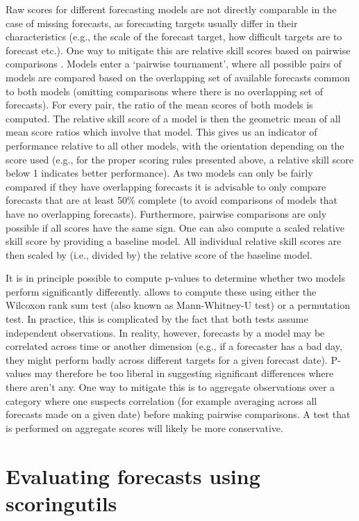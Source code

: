 \documentclass[
]{jss}
\begin{document}
Raw scores for different forecasting models are not directly comparable
in the case of missing forecasts, as forecasting targets usually differ
in their characteristics (e.g., the scale of the forecast target, how
difficult targets are to forecast etc.). One way to mitigate this are
relative skill scores based on pairwise comparisons
\citep{cramerEvaluationIndividualEnsemble2021}. Models enter a `pairwise
tournament', where all possible pairs of models are compared based on
the overlapping set of available forecasts common to both models
(omitting comparisons where there is no overlapping set of forecasts).
For every pair, the ratio of the mean scores of both models is computed.
The relative skill score of a model is then the geometric mean of all
mean score ratios which involve that model. This gives us an indicator
of performance relative to all other models, with the orientation
depending on the score used (e.g., for the proper scoring rules
presented above, a relative skill score below 1 indicates better
performance). As two models can only be fairly compared if they have
overlapping forecasts it is advisable to only compare forecasts that are
at least 50\% complete (to avoid comparisons of models that have no
overlapping forecasts). Furthermore, pairwise comparisons are only
possible if all scores have the same sign. One can also compute a scaled
relative skill score by providing a baseline model. All individual
relative skill scores are then scaled by (i.e., divided by) the relative
score of the baseline model.

It is in principle possible to compute p-values to determine whether two
models perform significantly differently.  allows to
compute these using either the Wilcoxon rank sum test (also known as
Mann-Whitney-U test) \citep{mannTestWhetherOne1947} or a permutation
test. In practice, this is complicated by the fact that both tests
assume independent observations. In reality, however, forecasts by a
model may be correlated across time or another dimension (e.g., if a
forecaster has a bad day, they might perform badly across different
targets for a given forecast date). P-values may therefore be too
liberal in suggesting significant differences where there aren't any.
One way to mitigate this is to aggregate observations over a category
where one suspects correlation (for example averaging across all
forecasts made on a given date) before making pairwise comparisons. A
test that is performed on aggregate scores will likely be more
conservative.

\hypertarget{evaluation-example}{%
\section{Evaluating forecasts using
scoringutils}\label{evaluation-example}}
\end{document}
